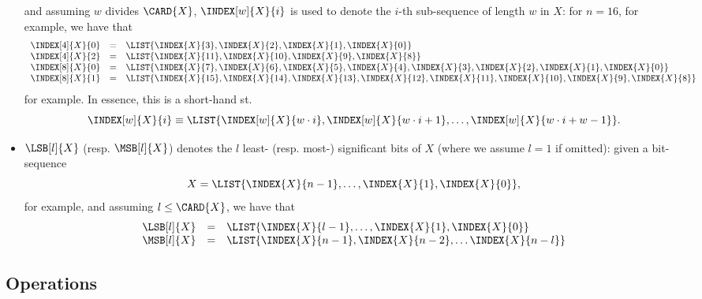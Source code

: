 \begin{itemize}
\[      \]
      and assuming $w$ divides $\CARD{X}$, $\INDEX[w]{X}{i}$ is used to denote 
      the $i$-th sub-sequence of length $w$ in $X$: for $n = 16$, for example, 
      we have that
      \[
      \begin{array}{lcl}
      \INDEX[4]{X}{0} &=& \LIST{ \INDEX{X}{ 3}, \INDEX{X}{ 2}, \INDEX{X}{ 1}, \INDEX{X}{ 0}                                                             } \\
      \INDEX[4]{X}{2} &=& \LIST{ \INDEX{X}{11}, \INDEX{X}{10}, \INDEX{X}{ 9}, \INDEX{X}{ 8}                                                             } \\
      \INDEX[8]{X}{0} &=& \LIST{ \INDEX{X}{ 7}, \INDEX{X}{ 6}, \INDEX{X}{ 5}, \INDEX{X}{ 4}, \INDEX{X}{ 3}, \INDEX{X}{ 2}, \INDEX{X}{ 1}, \INDEX{X}{ 0} } \\
      \INDEX[8]{X}{1} &=& \LIST{ \INDEX{X}{15}, \INDEX{X}{14}, \INDEX{X}{13}, \INDEX{X}{12}, \INDEX{X}{11}, \INDEX{X}{10}, \INDEX{X}{ 9}, \INDEX{X}{ 8} } \\
      \end{array}
      \]
      for example.  In essence, this is a short-hand st.
      \[
      \INDEX[w]{X}{i} \equiv \LIST{ \INDEX[w]{X}{w \cdot i}, \INDEX[w]{X}{w \cdot i + 1}, \ldots, \INDEX[w]{X}{w \cdot i + w - 1} } .
      \]
\item $\LSB[l]{X}$ (resp. $\MSB[l]{X}$) denotes the $l$ least- (resp. most-)
      significant bits of $X$ (where we assume $l = 1$ if omitted): given a
      bit-sequence
      \[
      X = \LIST{ \INDEX{X}{n-1}, \ldots, \INDEX{X}{1}, \INDEX{X}{0} } ,
      \]
      for example, and assuming $l \leq \CARD{X}$, we have that
      \[
      \begin{array}{lcl}
      \LSB[l]{X} &=& \LIST{ \INDEX{X}{l-1},                 \ldots, \INDEX{X}{  1}, \INDEX{X}{  0} } \\
      \MSB[l]{X} &=& \LIST{ \INDEX{X}{n-1}, \INDEX{X}{n-2}, \ldots                  \INDEX{X}{n-l} } \\
      \end{array}
      \]

\end{itemize}


\subsection{Operations}

